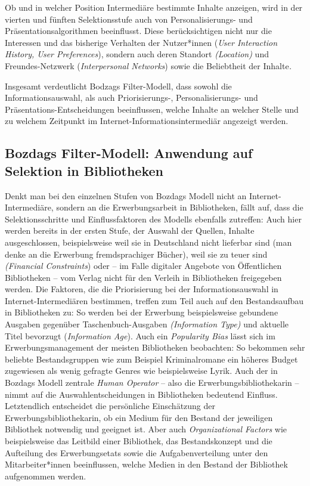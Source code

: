 \documentclass[a4paper,
fontsize=11pt,
oneside,
numbers=noperiodatend,
parskip=half-,
bibliography=totoc,
final
]{scrartcl}
\begin{document}
Ob und in welcher Position Intermediäre bestimmte Inhalte anzeigen, wird
in der vierten und fünften Selektionsstufe auch von Personalisierungs-
und Präsentationsalgorithmen beeinflusst. Diese berücksichtigen nicht
nur die Interessen und das bisherige Verhalten der Nutzer*innen
(\emph{User Interaction History, User Preferences}), sondern auch deren
Standort \emph{(Location)} und Freundes-Netzwerk (\emph{Interpersonal
Networks}) sowie die Beliebtheit der Inhalte\emph{.}

Insgesamt verdeutlicht Bodzags Filter-Modell, dass sowohl die
Informationsauswahl, als auch Priorisierungs-, Personalisierungs- und
Präsentations-Entscheidungen beeinflussen, welche Inhalte an welcher
Stelle und zu welchem Zeitpunkt im Internet-Informationsintermediär
angezeigt werden.

\hypertarget{bozdags-filter-modell-anwendung-auf-selektion-in-bibliotheken}{%
\subsection{Bozdags Filter-Modell: Anwendung auf Selektion in
Bibliotheken}\label{bozdags-filter-modell-anwendung-auf-selektion-in-bibliotheken}}

Denkt man bei den einzelnen Stufen von Bozdags Modell nicht an
Internet-Intermediäre, sondern an die Erwerbungsarbeit in Bibliotheken,
fällt auf, dass die Selektionsschritte und Einflussfaktoren des Modells
ebenfalls zutreffen: Auch hier werden bereits in der ersten Stufe, der
Auswahl der Quellen, Inhalte ausgeschlossen, beispielsweise weil sie in
Deutschland nicht lieferbar sind (man denke an die Erwerbung
fremdsprachiger Bücher), weil sie zu teuer sind \emph{(Financial
Constraints}) oder -- im Falle digitaler Angebote von Öffentlichen
Bibliotheken -- vom Verlag nicht für den Verleih in Bibliotheken
freigegeben werden. Die Faktoren, die die Priorisierung bei der
Informationsauswahl in Internet-Intermediären bestimmen, treffen zum
Teil auch auf den Bestandsaufbau in Bibliotheken zu: So werden bei der
Erwerbung beispielsweise gebundene Ausgaben gegenüber
Taschenbuch-Ausgaben \emph{(Information Type)} und aktuelle Titel
bevorzugt (\emph{Information Age}). Auch ein \emph{Popularity Bias}
lässt sich im Erwerbungsmanagement der meisten Bibliotheken beobachten:
So bekommen sehr beliebte Bestandsgruppen wie zum Beispiel
Kriminalromane ein höheres Budget zugewiesen als wenig gefragte Genres
wie beispielsweise Lyrik. Auch der in Bozdags Modell zentrale
\emph{Human Operator} -- also die Erwerbungsbibliothekarin -- nimmt auf
die Auswahlentscheidungen in Bibliotheken bedeutend Einfluss.
Letztendlich entscheidet die persönliche Einschätzung der
Erwerbungsbibliothekarin, ob ein Medium für den Bestand der jeweiligen
Bibliothek notwendig und geeignet ist. Aber auch \emph{Organizational
Factors} wie beispielsweise das Leitbild einer Bibliothek, das
Bestandskonzept und die Aufteilung des Erwerbungsetats sowie die
Aufgabenverteilung unter den Mitarbeiter*innen beeinflussen, welche
Medien in den Bestand der Bibliothek aufgenommen werden.
\end{document}

